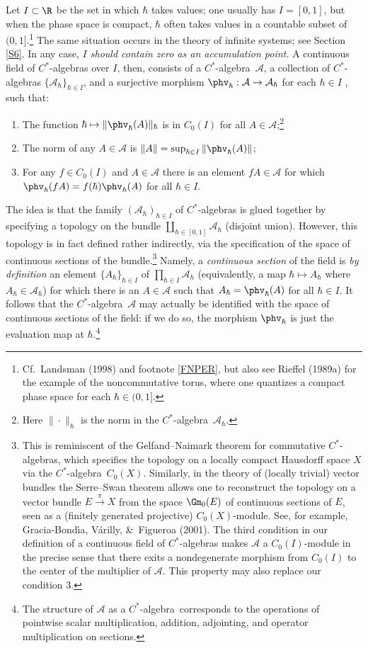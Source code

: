 \documentclass[12pt,titlepage]{article}
\newcommand{\ca}{$C^*$-algebra} \newcommand{\jba}{JB-algebra}
\newcommand{\raw}{\rightarrow} \newcommand{\rat}{\mapsto}
\newcommand{\CA}{{\mathcal A}} \newcommand{\CB}{{\mathcal B}}
\begin{document}
 Let  $I\subset \R$ be the set in which $\hbar$ takes values; one usually has $I=[0,1]$, but when the phase space is compact, $\hbar$ often takes values in a countable subset of $(0,1]$.\footnote{Cf.\ Landsman (1998) and footnote  \ref{FNPER}, but also see Rieffel (1989a) for the example of the noncommutative torus, where one quantizes a compact phase space for each $\hbar\in(0,1]$.} The same situation occurs in the theory of infinite systems; see Section \ref{S6}.  In any case, {\it $I$ should contain zero as an accumulation point.}  A continuous field of $C^*$-algebras over $I$, then,  consists of a
 \ca\ $\CA$, a collection of \ca s $\{\CA_{\hbar}\}_{{\hbar}\in I}$, and a surjective morphism $\phv_{\hbar}:\CA\raw\CA_{\hbar}$ for each $\hbar\in I$ , such that:
\begin{enumerate}
\item
The function ${\hbar}\mapsto  \|\phv_{\hbar}(A)\|_{\hbar}$ is in $C_0(I)$ for all $A\in\CA$;\footnote{Here $\|\cdot\|_{\hbar}$ is the norm in the \ca\ $\CA_{\hbar}$.}
\item
The norm of any $A\in\CA$ is $\| A\|=\sup_{{\hbar}\in I}\|\phv_{\hbar}(A)\|$;
\item
For any $f\in C_0(I)$ and $A\in\CA$ there is an element $fA\in\CA$ for
which $\phv_{\hbar}(fA)=f({\hbar})\phv_{\hbar}(A)$ for all ${\hbar}\in I$.
\end{enumerate}
 
The idea is that the  family $(\CA_{\hbar})_{\hbar\in I}$ of \ca s is glued together by specifying a topology on the bundle 
$\coprod_{\hbar\in [0,1]}\CA_{\hbar}$ (disjoint union). However, this topology is in fact defined rather indirectly, via the specification of the space of continuous sections of the bundle.\footnote{This is reminiscent of the Gelfand--Naimark theorem for commutative \ca s, which specifies the topology on a locally compact Hausdorff space $X$ via the \ca\ $C_0(X)$. Similarly, in the theory of (locally trivial) vector bundles the Serre--Swan theorem allows one to reconstruct the topology on a vector bundle $E\stackrel{\pi}{\raw} X$ from the space $\Gm_0(E)$ of continuous sections of $E$, seen as a (finitely generated projective) $C_0(X)$-module. See, for example,  Gracia-Bond\'{\i}a,    V\'{a}rilly,  \&\ Figueroa (2001). The third condition in our definition of a continuous field of \ca s makes $\CA$ a $C_0(I)$-module in the precise sense that there exits 
a nondegenerate morphism from $C_0(I)$ to the center of the multiplier of $\CA$. This property may also replace our condition 3.} Namely, a {\it continuous section}
of the field is {\it by definition} an element $\{A_{\hbar}\}_{{\hbar}\in I}$ of $\prod_{{\hbar}\in I}\CA_{\hbar}$ (equivalently, a map $\hbar\mapsto A_{\hbar}$
where $A_{\hbar}\in \CA_{\hbar}$)
 for which there is an $A\in \CA$ such that $A_{\hbar}=\phv_{\hbar}(A)$ for all ${\hbar}\in I$. It follows that
the \ca\ $\CA$ may actually be identified with the space of continuous sections of the field: if we do so, the morphism $\phv_{\hbar}$ is just the evaluation
 map at $\hbar$.\footnote{The structure of $\CA$  as a \ca\ corresponds to the operations of pointwise scalar multiplication,
addition, adjointing, and operator multiplication on sections.}
 
\end{document}

